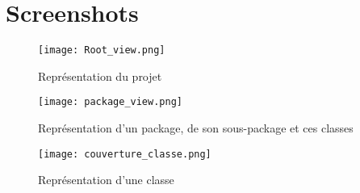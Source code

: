 \section{Screenshots}

\begin{figure}
\texttt{[image: Root\_view.png]}
\caption{Représentation du projet}
\end{figure}

\begin{figure}
\texttt{[image: package\_view.png]}
\caption{Représentation d'un package, de son sous-package et ces classes}
\end{figure}

\begin{figure}
\texttt{[image: couverture\_classe.png]}
\caption{Représentation d'une classe}
\end{figure}
